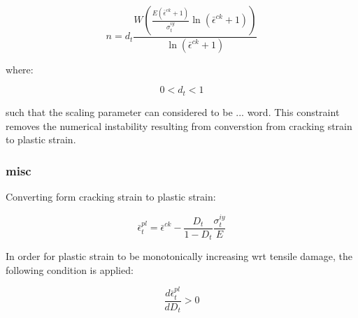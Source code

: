 \begin{equation}
n=d_{t}\frac{W\left(\frac{E\left(\bar{\epsilon}^{ck}+1\right)}{\sigma_{t}^{iy}}\ln\left(\bar{\epsilon}^{ck}+1\right)\right)}{\ln\left(\bar{\epsilon}^{ck}+1\right)}\label{eqn:param9}
\end{equation}


where:

\begin{equation}
0<d_{t}<1\label{eqn:param10}
\end{equation}


such that the scaling parameter can considered to be ... word. This
constraint removes the numerical instability resulting from converstion
from cracking strain to plastic strain. 


\subsubsection{misc}

Converting form cracking strain to plastic strain:

\begin{equation}
\bar{\epsilon}_{t}^{pl}=\bar{\epsilon}^{ck}-\frac{D_{t}}{1-D_{t}}\frac{\sigma_{t}^{iy}}{E}\label{eqn:param5}
\end{equation}


In order for plastic strain to be monotonically increasing wrt tensile
damage, the following condition is applied:

\begin{equation}
\frac{d\bar{\epsilon}_{t}^{pl}}{dD_{t}}>0\label{eqn:param6}
\end{equation}
